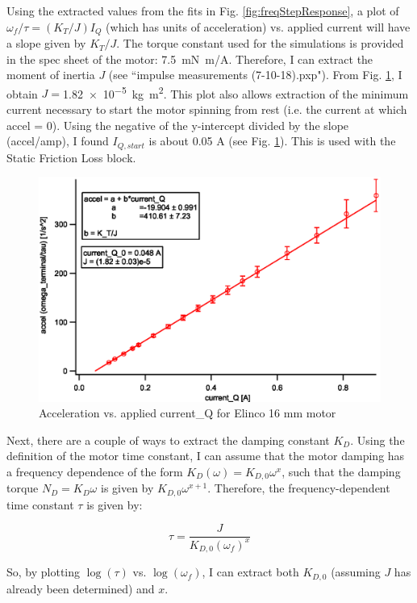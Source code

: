 \documentclass[11pt]{article} %
\begin{document}
Using the extracted values from the fits in Fig. \ref{fig:freqStepResponse}, a plot of $\omega_f/\tau = (K_T/J)I_Q$ (which has units of acceleration) vs. applied current will have a slope given by $K_T/J$. The torque constant used for the simulations is provided in the spec sheet of the motor: \SI{7.5}{mN.m/A}. Therefore, I can extract the moment of inertia $J$ (see ``impulse measurements (7-10-18).pxp"). From Fig. \ref{fig:accelVsCurrent}, I obtain $J=$\SI{1.82e-5}{kg.m^2}. This plot also allows extraction of the minimum current necessary to start the motor spinning from rest (i.e. the current at which accel = 0). Using the negative of the y-intercept divided by the slope (accel/amp), I found $I_{Q,start}$ is about 0.05 A (see Fig. \ref{fig:accelVsCurrent}). This is used with the Static Friction Loss block. 
\begin{figure}
\centering
\includegraphics[scale=0.75]{accelVsCurrent.eps}
\caption{Acceleration vs. applied current\_Q for Elinco 16 mm motor}
\label{fig:accelVsCurrent}
\end{figure}

Next, there are a couple of ways to extract the damping constant $K_D$. Using the definition of the motor time constant, I can assume that the motor damping has a frequency dependence of the form $K_D(\omega) = K_{D,0} \omega^x$, such that the damping torque $N_D = K_D \omega$  is given by $ K_{D,0} \omega^{x+1}$. Therefore, the frequency-dependent time constant $\tau$ is given by:

\begin{equation}
\tau = \frac{J}{K_{D,0} (\omega_f)^x}
\end{equation}

\noindent So, by plotting $\log(\tau)$ vs. $\log(\omega_f)$, I can extract both $K_{D,0}$ (assuming $J$ has already been determined) and $x$.
\end{document}

